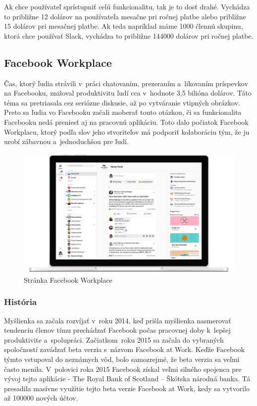 \indent Ak chce používateľ sprístupniť celú funkcionalitu, tak je to dosť drahé. Vychádza to približne 12 dolárov na používateľa mesačne pri ročnej platbe alebo približne 15 dolárov pri mesačnej platbe. Ak teda napríklad máme 1000 člennú skupinu, ktorá chce používať Slack, vychádza to približne 144000 dolárov pri ročnej platbe.

\subsection{Facebook Workplace}
\indent Čas, ktorý ľudia strávili v práci chatovaním, prezeraním a likovaním príspevkov na Facebooku, znižoval produktivitu ľudí cca v hodnote 3,5 bilióna dolárov. Táto téma sa pretriasala cez seriózne diskusie, až po vytváranie vtipných obrázkov. Preto sa ľudia vo Facebooku začali zaoberať touto otázkou, či sa funkcionalita Facebooku nedá preniesť aj na pracovnú aplikáciu. Toto dalo počiatok Facebook Workplacu, ktorý podľa slov jeho stvoriteľov má podporiť kolaboráciu tým, že ju urobí zábavnou a jednoduchšou pre ľudí.

\begin{figure}[H]
    \centering
    \includegraphics[scale=0.25]{img/obr-fb-workplace.jpg}
    \caption{Stránka Facebook Workplace}
    \label{fig:img-fb-workplace}
\end{figure}

\subsubsection{História}
\indent Myšlienka sa začala rozvíjať v roku 2014, keď prišla myšlienka nasmerovať tendenciu členov tímu prechádzať Facebook počas pracovnej doby k lepšej produktivite a spolupráci. Začiatkom roku 2015 sa začala do vybraných spoločností zavádzať beta verzia s názvom Facebook at Work. Keďže Facebook týmto vstupoval do neznámych vôd, bolo samozrejmé, že beta verzia sa veľmi často menila. V polovici roka 2015 Facebook získal veľmi silného spojenca pre vývoj tejto aplikácie - The Royal Bank of Scotland – Škótska národná banka. Tá presadila masívne využitie tejto beta verzie Facebook at Work, kedy sa vytvorilo až 100000 nových účtov. 

